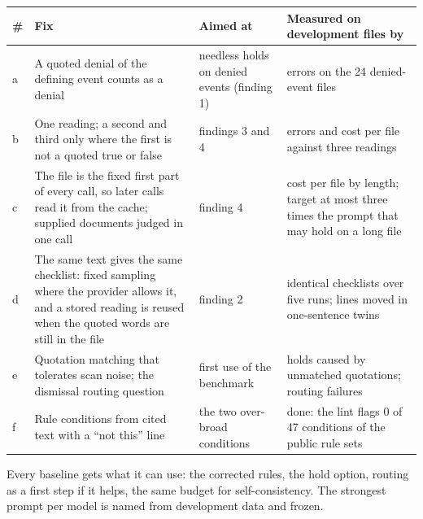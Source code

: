 \documentclass[10pt]{article}
\newcommand{\sect}[1]{\needspace{5\baselineskip}\vspace{3pt}{\bfseries #1\par}\vspace{1pt}}
\begin{document}
{\begin{enumerate}
\end{enumerate}
\sect{2. Fixes, on development data only}
\begin{tabularx}{\linewidth}{>{\raggedright\arraybackslash}p{0.8em}>{\hsize=1.3\hsize\raggedright\arraybackslash}X>{\hsize=0.8\hsize\raggedright\arraybackslash}X>{\hsize=0.9\hsize\raggedright\arraybackslash}X}\toprule
\textbf{\#} & \textbf{Fix} & \textbf{Aimed at} & \textbf{Measured on development files by}\\\midrule
a & A quoted denial of the defining event counts as a denial & needless holds on denied events (finding 1) & errors on the 24 denied-event files\\
b & One reading; a second and third only where the first is not a quoted true or false & findings 3 and 4 & errors and cost per file against three readings\\
c & The file is the fixed first part of every call, so later calls read it from the cache; supplied documents judged in one call & finding 4 & cost per file by length; target at most three times the prompt that may hold on a long file\\
d & The same text gives the same checklist: fixed sampling where the provider allows it, and a stored reading is reused when the quoted words are still in the file & finding 2 & identical checklists over five runs; lines moved in one-sentence twins\\
e & Quotation matching that tolerates scan noise; the dismissal routing question & first use of the benchmark & holds caused by unmatched quotations; routing failures\\
f & Rule conditions from cited text with a “not this” line & the two over-broad conditions & done: the lint flags 0 of 47 conditions of the public rule sets\\
\bottomrule\end{tabularx}

Every baseline gets what it can use: the corrected rules, the hold option, routing as a first step if it helps, the same budget for self-consistency. The strongest prompt per model is named from development data and frozen.

}
\end{document}
